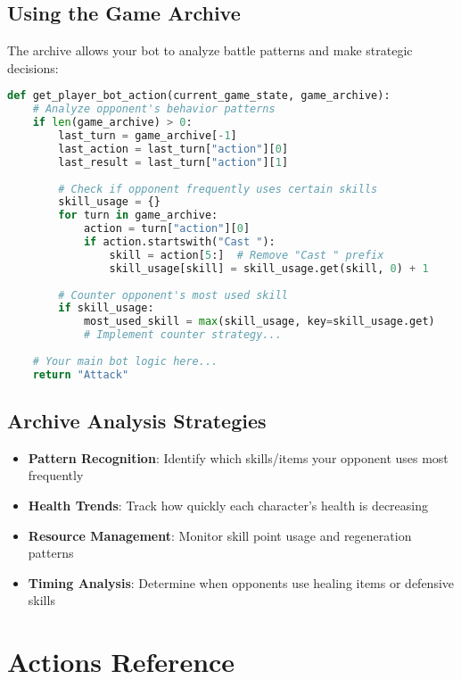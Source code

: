 \documentclass[12pt]{article}
\begin{document}
\subsection{Using the Game Archive}
The archive allows your bot to analyze battle patterns and make strategic decisions:

\begin{lstlisting}[language=Python, caption=Example Archive Usage]
def get_player_bot_action(current_game_state, game_archive):
    # Analyze opponent's behavior patterns
    if len(game_archive) > 0:
        last_turn = game_archive[-1]
        last_action = last_turn["action"][0]
        last_result = last_turn["action"][1]
        
        # Check if opponent frequently uses certain skills
        skill_usage = {}
        for turn in game_archive:
            action = turn["action"][0]
            if action.startswith("Cast "):
                skill = action[5:]  # Remove "Cast " prefix
                skill_usage[skill] = skill_usage.get(skill, 0) + 1
        
        # Counter opponent's most used skill
        if skill_usage:
            most_used_skill = max(skill_usage, key=skill_usage.get)
            # Implement counter strategy...
    
    # Your main bot logic here...
    return "Attack"
\end{lstlisting}

\subsection{Archive Analysis Strategies}
\begin{itemize}
    \item \textbf{Pattern Recognition}: Identify which skills/items your opponent uses most frequently
    \item \textbf{Health Trends}: Track how quickly each character's health is decreasing
    \item \textbf{Resource Management}: Monitor skill point usage and regeneration patterns
    \item \textbf{Timing Analysis}: Determine when opponents use healing items or defensive skills
\end{itemize}

\section{Actions Reference}
\label{sec:actions}
\end{document}
